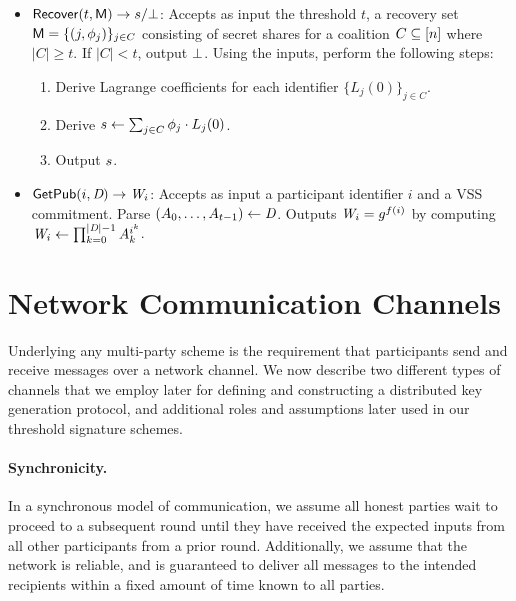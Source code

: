 \begin{itemize}
  \item {\sloppy $\mathsf{Recover}(t, \mathsf{M}) \rightarrow s/\bot$:
    Accepts as input the threshold $t$,
    a recovery set $\mathsf{M} = \{ (j, \phi_j) \}_{j \in C}$
    consisting of secret shares for a coalition $C \subseteq [n]$
    where $\lvert C \rvert \geq t$.
    If $\lvert C \rvert < t$,
    output $\bot$.
    Using the inputs, perform the following steps:
    \begin{enumerate}
      \item Derive Lagrange coefficients for each identifier $\{ L_j(0)\}_{j \in C}$.
        \item Derive $s \gets \sum_{j \in C} \phi_j \cdot L_j(0)$.
        \item Output $s$.
    \end{enumerate}}

    \item $\mathsf{GetPub}(i, \textit{D}) \rightarrow \textit{W}_i$:
      Accepts as input a participant identifier $i$ and a VSS commitment.
      Parse $(A_0, \ldots, A_{t-1} ) \gets \textit{D}$.
      Outputs $\textit{W}_i = g^{f(i)}$ by computing
      $\textit{W}_i \gets \prod_{k=0}^{|\textit{D}|-1} A_k^{i^k}$.
\end{itemize}










\section{Network Communication Channels}
\label{prelim:network}

Underlying any multi-party scheme is the requirement that participants send and receive messages over a network channel.
We now describe two different types of channels that we employ later for defining and constructing a distributed key generation protocol,
and additional roles and assumptions later used in our threshold signature schemes.

\paragraph{Synchronicity.}
In a synchronous model of communication,
we assume all honest parties wait to proceed to a subsequent round until
they have received the expected inputs from all other participants from a prior round.
Additionally,
we assume that the network is reliable,
and is guaranteed to deliver all messages to the intended recipients within a fixed amount of time known to all parties.

